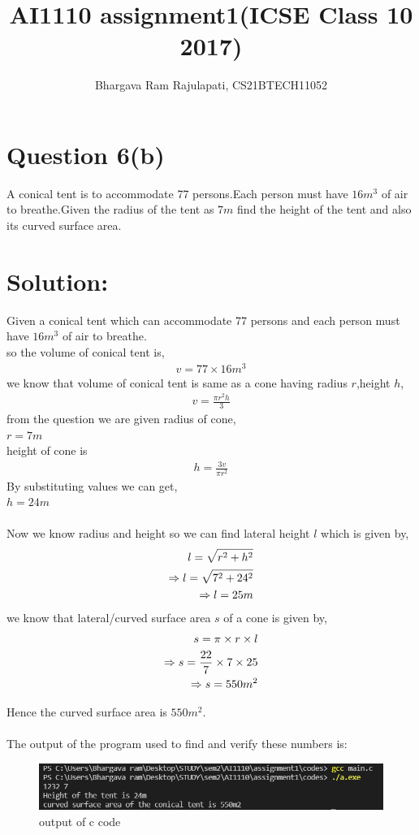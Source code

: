 \documentclass[article,12pt,twocolumn]{IEEEtran}
\title{AI1110 assignment1(ICSE Class 10 2017)}
\author{Bhargava Ram Rajulapati, CS21BTECH11052}
\begin{document}
  \maketitle
  \section*{Question 6(b)}
   A conical tent is to accommodate 77 persons.Each person must  
   have $16m^3$ of air to breathe.Given the radius of the tent as
   $7m$ find the height of the tent and also its curved surface
   area.\\
  \section*{Solution:}
  Given a conical tent which can accommodate 77 persons and each         
   person must have $16m^3$ of air to breathe.\\
  so the volume of conical tent is,
  \begin{align*}
    v = 77 \times 16 m^3 
  \end{align*}
  we know that volume of conical tent is same as a cone having
  radius $r$,height $h$,
  \begin{align*}
     v = \frac{\pi r^2 h}{3} 
  \end{align*}
  from the question we are given radius of cone, \\
  $ r = 7 m $\\ 
  height of cone is
  \begin{align*}
   h = \frac{3 v}{\pi r^2} 
  \end{align*}
  By substituting values we can get, \\
  $ h = 24 m $ \\\\
  Now we know radius and height so we can find lateral height $l$
  which is given by,
  \begin{align*}
    \hspace*{12pt} l = \sqrt{r^2 + h^2} \\
    \Rightarrow l = \sqrt{7^2 + 24^2} \\
    \Rightarrow l = 25 m
  \end{align*}
  we know that lateral/curved surface area $s$ of a cone is given
  by,
  \begin{align*}
    \hspace*{12pt} s = \pi \times r \times l \\
    \Rightarrow  s = \frac{22}{7} \times 7 \times 25  \\
    \Rightarrow  s = 550 m^2 
  \end{align*}
   
  Hence the curved surface area is $ 550 m^2 $. \\\\
  The output of the program used to find and verify these numbers
  is: \\
  \begin{figure}[h]
  \centering 
  \includegraphics[scale = 0.6]{output.png}
  \caption{output of c code}
  \end{figure}   
\end{document}
